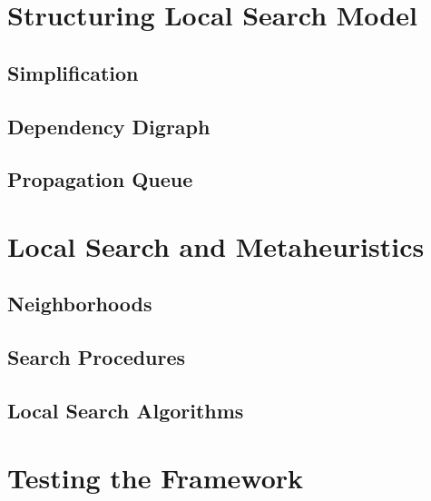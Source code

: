 \documentclass[a4paper,11pt]{article}
\begin{document}
\newpage
\section{Structuring Local Search Model} \label{sec_ls}

  \subsection{Simplification}
  
  \subsection{Dependency Digraph}
     \label{sec_ddg}
  \subsection{Propagation Queue}  
    \label{sec_propaqueue}
    
  
\newpage  
%
\section{Local Search and Metaheuristics} \label{sec_local}
  
  \subsection{Neighborhoods}
  
  \subsection{Search Procedures}
  
  \subsection{Local Search Algorithms}
  
  \newpage
\section{Testing the Framework}

%


\end{document}
